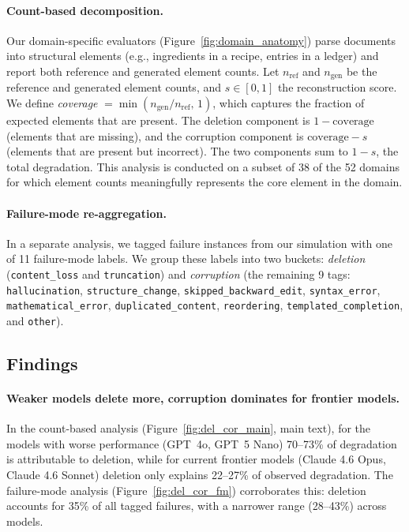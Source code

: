 \documentclass{article} %
\begin{document}
\paragraph{Count-based decomposition.} Our domain-specific evaluators (Figure~\ref{fig:domain_anatomy}) parse documents into structural elements (e.g., ingredients in a recipe, entries in a ledger) and report both reference and generated element counts. Let $n_{\mathrm{ref}}$ and $n_{\mathrm{gen}}$ be the reference and generated element counts, and $s \in [0, 1]$ the reconstruction score. We define \textit{coverage} $= \min(n_{\mathrm{gen}} / n_{\mathrm{ref}},\, 1)$, which captures the fraction of expected elements that are present. The deletion component is $1 - \text{coverage}$ (elements that are missing), and the corruption component is $\text{coverage} - s$ (elements that are present but incorrect). The two components sum to $1 - s$, the total degradation. This analysis is conducted on a subset of 38 of the 52 domains for which element counts meaningfully represents the core element in the domain.

\paragraph{Failure-mode re-aggregation.} In a separate analysis, we tagged failure instances from our simulation with one of 11 failure-mode labels. We group these labels into two buckets: \textit{deletion} (\texttt{content\_loss} and \texttt{truncation}) and \textit{corruption} (the remaining 9 tags: \texttt{hallucination}, \texttt{structure\_change}, \texttt{skipped\_backward\_edit}, \texttt{syntax\_error}, \texttt{mathematical\_error}, \texttt{duplicated\_content}, \texttt{reordering}, \texttt{templated\_completion}, and \texttt{other}).

\subsection{Findings}

\paragraph{Weaker models delete more, corruption dominates for frontier models.} In the count-based analysis (Figure~\ref{fig:del_cor_main}, main text), for the models with worse performance (GPT~4o, GPT~5 Nano) 70--73\% of degradation is attributable to deletion, while for current frontier models (Claude 4.6 Opus, Claude 4.6 Sonnet) deletion only explains 22--27\% of observed degradation. The failure-mode analysis (Figure~\ref{fig:del_cor_fm}) corroborates this: deletion accounts for 35\% of all tagged failures, with a narrower range (28--43\%) across models.
\end{document}
